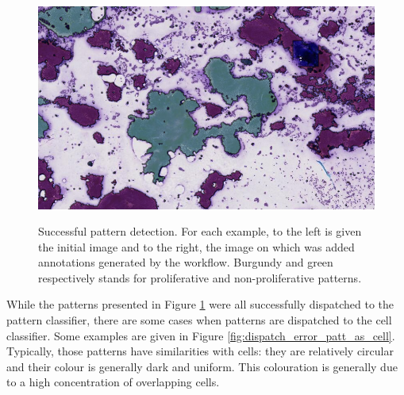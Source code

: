 \begin{figure}
{		\includegraphics[scale=0.31]{image/success_pattern_4_pat.png}
	}
	\caption{Successful pattern detection. For each example, to the left is given the initial image and to the right, the image on which was added annotations generated by the workflow. Burgundy and green respectively stands for proliferative and non-proliferative patterns.}
	\label{fig:detect_success_pattern}
\end{figure}

While the patterns presented in Figure \ref{fig:detect_success_pattern} were all successfully dispatched to the pattern classifier, there are some cases when patterns are dispatched to the cell classifier. Some examples are given in Figure \ref{fig:dispatch_error_patt_as_cell}. Typically, those patterns have similarities with cells: they are relatively circular and their colour is generally dark and uniform. This colouration is generally due to a high concentration of overlapping cells.


